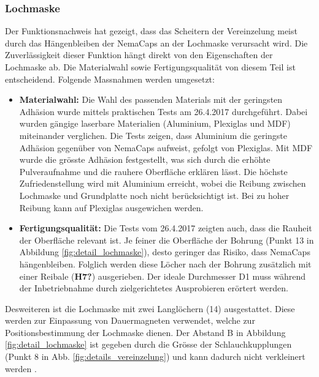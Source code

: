 \subsubsection{Lochmaske}
\label{lochmaske}
Der Funktionsnachweis hat gezeigt, dass das Scheitern der Vereinzelung meist durch das Hängenbleiben der NemaCaps an der Lochmaske verursacht wird. Die Zuverlässigkeit dieser Funktion hängt direkt von den Eigenschaften der Lochmaske ab. Die Materialwahl sowie Fertigungsqualität von diesem Teil ist entscheidend. 
\newline
Folgende Massnahmen werden umgesetzt:
\begin{itemize}
	\item \textbf{Materialwahl:} Die Wahl des passenden Materials mit der geringsten Adhäsion wurde mittels praktischen Tests am 26.4.2017 durchgeführt. Dabei wurden gängige laserbare Materialien (Aluminium, Plexiglas und MDF) miteinander verglichen. Die Tests zeigen, dass Aluminium die geringste Adhäsion gegenüber von NemaCaps aufweist, gefolgt von Plexiglas. Mit MDF wurde die grösste Adhäsion festgestellt, was sich durch die erhöhte Pulveraufnahme und die rauhere Oberfläche erklären lässt. 
	Die höchste Zufriedenstellung wird mit Aluminium erreicht, wobei die Reibung zwischen Lochmaske und Grundplatte noch nicht berücksichtigt ist. Bei zu hoher Reibung kann auf Plexiglas ausgewichen werden.
	
	\item \textbf{Fertigungsqualität:} Die Tests vom 26.4.2017 zeigten auch, dass die Rauheit der Oberfläche relevant ist. Je feiner die Oberfläche der Bohrung (Punkt 13 in Abbildung \ref{fig:detail_lochmaske}), desto geringer das Risiko, dass NemaCaps hängenbleiben. Folglich werden diese Löcher nach der Bohrung zusätzlich mit einer Reibale (\textbf{H7?}) ausgerieben. Der ideale Durchmesser D1 muss während der Inbetriebnahme durch zielgerichtetes Ausprobieren erörtert werden.
	
\end{itemize}
Desweiteren ist die Lochmaske mit zwei Langlöchern (14) ausgestattet. Diese werden zur Einpassung von Dauermagneten verwendet, welche zur Positionsbestimmung der Lochmaske dienen. Der Abstand B in Abbildung \ref{fig:detail_lochmaske} ist gegeben durch die Grösse der Schlauchkupplungen (Punkt 8 in Abb. \ref{fig:details_vereinzelung}) und kann dadurch nicht verkleinert werden \cite{camozzi2}.
